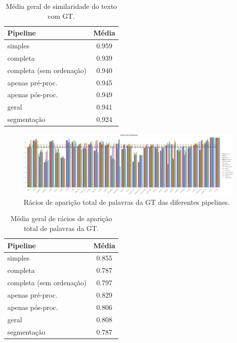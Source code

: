 \begin{table}[H]
	\centering
	\begin{tabular}{|l|c|}
		\hline
		\textbf{Pipeline} & \textbf{Média} \\ \hline
		simples & 0.959 				   \\ \hline
		completa & 0.939 				   \\ \hline
		completa (sem ordenação) & 0.940   \\ \hline
		apenas pré-proc. & 0.945 		   \\ \hline
		apenas pós-proc. & 0.949 		   \\ \hline
		geral & 0.941 					   \\ \hline
		segmentação & 0.924 			   \\ \hline
	\end{tabular}
	\caption{Média geral de similaridade do texto com GT.}
\end{table}



\begin{figure}[H]
	\centering
	\hspace*{-2cm}
	\includegraphics[width=1.2\textwidth]{images/resultados/graph_gt_word_hit_ratio.png}
	\caption{Rácios de aparição total de palavras da GT das diferentes pipelines.}
	\label{fig:graph_gt_word_hit_ratio}
\end{figure}


\begin{table}[H]
	\centering
	\begin{tabular}{|l|c|}
		\hline
		\textbf{Pipeline} & \textbf{Média} \\ \hline
		simples & 0.855 				   \\ \hline
		completa & 0.787 				   \\ \hline
		completa (sem ordenação) & 0.797   \\ \hline
		apenas pré-proc. & 0.829 		   \\ \hline
		apenas pós-proc. & 0.806 		   \\ \hline
		geral & 0.808 					   \\ \hline
		segmentação & 0.787 			   \\ \hline
	\end{tabular}
	\caption{Média geral de rácios de aparição total de palavras da GT.}
\end{table}




